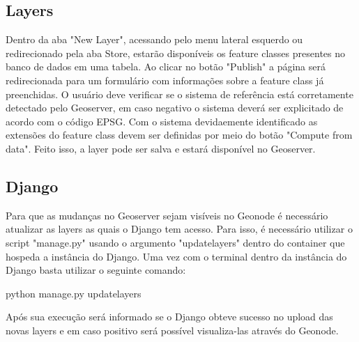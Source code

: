 \documentclass[12pt]{article}
\begin{document}
\subsection{Layers}
Dentro da aba "New Layer", acessando pelo menu lateral esquerdo ou
redirecionado pela aba Store, estarão disponíveis os feature classes presentes
no banco de dados em uma tabela. Ao clicar no botão "Publish" a página será
redirecionada para um formulário com informações sobre a feature class já
preenchidas. O usuário deve verificar se o sistema de referência está
corretamente detectado pelo Geoserver, em caso negativo o sistema deverá ser
explicitado de acordo com o código EPSG. Com o sistema devidaemente
identificado as extensões do feature class devem ser definidas por meio do
botão "Compute from data". Feito isso, a layer pode ser salva e estará
disponível no Geoserver.

\subsection{Django}
Para que as mudanças no Geoserver sejam visíveis no Geonode é necessário
atualizar as layers as quais o Django tem acesso. Para isso, é necessário
utilizar o script "manage.py" usando o argumento "updatelayers" dentro do
container que hospeda a instância do Django. Uma vez com o terminal dentro da
instância do Django basta utilizar o seguinte comando: 

python manage.py updatelayers

Após sua execução será informado se o Django obteve sucesso no upload das novas
layers e em caso positivo será possível visualiza-las através do Geonode.



\end{document}
